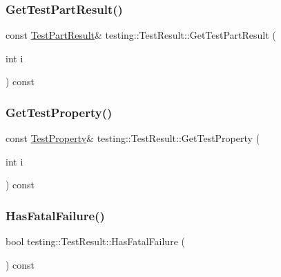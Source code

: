 \mbox{\label{classtesting_1_1_test_result_a910b410d0d1e066cd9e182f9e07d1933}} 
\subsubsection{\texorpdfstring{GetTestPartResult()}{GetTestPartResult()}}
{\footnotesize\ttfamily const \mbox{\hyperlink{classtesting_1_1_test_part_result}{Test\+Part\+Result}}\& testing\+::\+Test\+Result\+::\+Get\+Test\+Part\+Result (\begin{DoxyParamCaption}\item[{int}]{i }\end{DoxyParamCaption}) const}

\mbox{\label{classtesting_1_1_test_result_a491ede3939a9ca508e338929762cb148}} 
\subsubsection{\texorpdfstring{GetTestProperty()}{GetTestProperty()}}
{\footnotesize\ttfamily const \mbox{\hyperlink{classtesting_1_1_test_property}{Test\+Property}}\& testing\+::\+Test\+Result\+::\+Get\+Test\+Property (\begin{DoxyParamCaption}\item[{int}]{i }\end{DoxyParamCaption}) const}

\mbox{\label{classtesting_1_1_test_result_a30e00d4076ae07fb5ad7b623d9dc1fe4}} 
\subsubsection{\texorpdfstring{HasFatalFailure()}{HasFatalFailure()}}
{\footnotesize\ttfamily bool testing\+::\+Test\+Result\+::\+Has\+Fatal\+Failure (\begin{DoxyParamCaption}{ }\end{DoxyParamCaption}) const}


